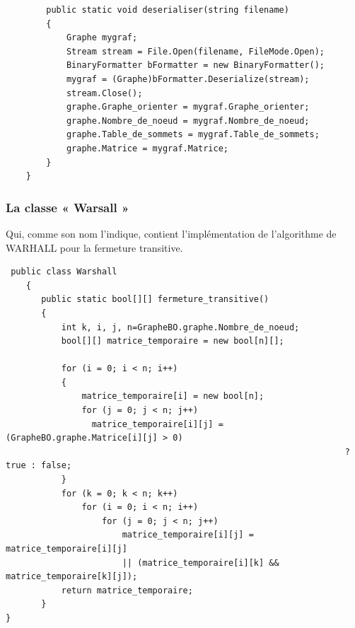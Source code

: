 \documentclass[11pt,twoside,a4paper]{article}
\begin{document}
\begin{verbatim}
        public static void deserialiser(string filename)
        {
            Graphe mygraf;
            Stream stream = File.Open(filename, FileMode.Open);
            BinaryFormatter bFormatter = new BinaryFormatter();
            mygraf = (Graphe)bFormatter.Deserialize(stream);
            stream.Close();
            graphe.Graphe_orienter = mygraf.Graphe_orienter;
            graphe.Nombre_de_noeud = mygraf.Nombre_de_noeud;
            graphe.Table_de_sommets = mygraf.Table_de_sommets;
            graphe.Matrice = mygraf.Matrice;
        }
    }
\end{verbatim}

\subsubsection{La classe « Warsall » }
Qui, comme son nom l’indique, contient l’implémentation de l’algorithme de WARHALL pour la fermeture transitive.
\begin{verbatim}
 public class Warshall
    {
       public static bool[][] fermeture_transitive() 
       {
           int k, i, j, n=GrapheBO.graphe.Nombre_de_noeud;
           bool[][] matrice_temporaire = new bool[n][];

           for (i = 0; i < n; i++)
           {
               matrice_temporaire[i] = new bool[n];
               for (j = 0; j < n; j++)
                 matrice_temporaire[i][j] = (GrapheBO.graphe.Matrice[i][j] > 0)
                                                                   ? true : false;
           }
           for (k = 0; k < n; k++)
               for (i = 0; i < n; i++)
                   for (j = 0; j < n; j++)
                       matrice_temporaire[i][j] = matrice_temporaire[i][j] 
                       || (matrice_temporaire[i][k] && matrice_temporaire[k][j]);
           return matrice_temporaire;
       }
}
\end{verbatim}
\end{document}
